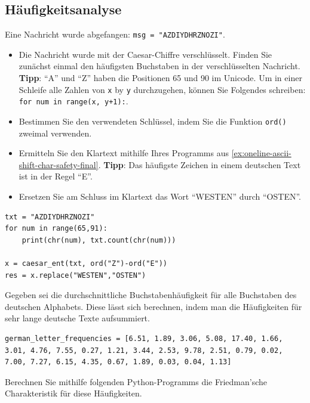 \newpage\subsection{Häufigkeitsanalyse}
\begin{myexercise}
Eine Nachricht wurde abgefangen: \lstinline|msg = "AZDIYDHRZNOZI"|.

\begin{itemize}
\item Die Nachricht wurde mit der Caesar-Chiffre verschlüsselt. Finden Sie  zunächst einmal den häufigsten Buchstaben in der verschlüsselten Nachricht. \textbf{Tipp}: ``A'' und ``Z'' haben die Positionen 65 und 90 im Unicode. Um in einer Schleife alle Zahlen von \texttt{x} by \texttt{y} durchzugehen, können Sie Folgendes schreiben: \lstinline|for num in range(x, y+1):|.

\item Bestimmen Sie den verwendeten Schlüssel, indem Sie die Funktion \lstinline|ord()| zweimal verwenden.

\item Ermitteln Sie den Klartext mithilfe Ihres Programms aus \cref{ex:oneline-ascii-shift-char-safety-final}. \textbf{Tipp}: Das häufigste Zeichen in einem deutschen Text ist in der Regel ``E''.

\item Ersetzen Sie am Schluss im Klartext das Wort ``WESTEN'' durch ``OSTEN''.

\end{itemize}
\begin{myanswer}
\begin{lstlisting}
txt = "AZDIYDHRZNOZI"
for num in range(65,91):
    print(chr(num), txt.count(chr(num)))
    
x = caesar_ent(txt, ord("Z")-ord("E"))
res = x.replace("WESTEN","OSTEN")
\end{lstlisting}
\end{myanswer}
\end{myexercise}


\begin{myexercise}
Gegeben sei die durchschnittliche Buchstabenhäufigkeit für alle Buchstaben des deutschen Alphabets. Diese lässt sich berechnen, indem man die Häufigkeiten für sehr lange deutsche Texte aufsummiert.

\begin{lstlisting}[numbers=none]
german_letter_frequencies = [6.51, 1.89, 3.06, 5.08, 17.40, 1.66, 3.01, 4.76, 7.55, 0.27, 1.21, 3.44, 2.53, 9.78, 2.51, 0.79, 0.02, 7.00, 7.27, 6.15, 4.35, 0.67, 1.89, 0.03, 0.04, 1.13]
\end{lstlisting}

Berechnen Sie mithilfe folgenden Python-Programms die Friedman'sche Charakteristik für diese Häufigkeiten.

\end{myexercise}


